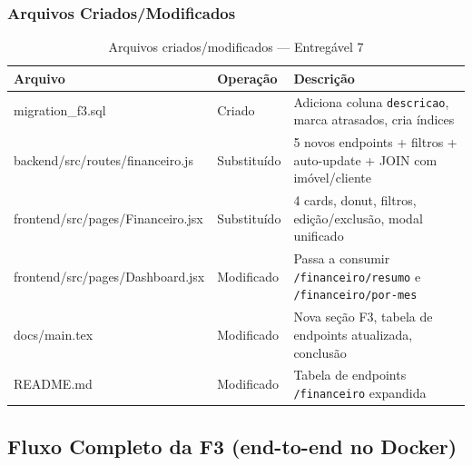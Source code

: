 \documentclass[12pt, a4paper]{article}
\newcommand{\thead}[1]{\cellcolor{tableheader}\color{white}\bfseries #1}
\newcommand{\talt}{\rowcolor{tablerowalt}}
\begin{document}
\subsubsection{Arquivos Criados/Modificados}

\begin{table}[H]
\centering
\begin{tabularx}{\textwidth}{|l|l|X|}
\hline
\thead{Arquivo} & \thead{Operação} & \thead{Descrição} \\
\hline
migration\_f3.sql                       & Criado     & Adiciona coluna \texttt{descricao}, marca atrasados, cria índices \\
\talt backend/src/routes/financeiro.js  & Substituído & 5 novos endpoints + filtros + auto-update + JOIN com imóvel/cliente \\
frontend/src/pages/Financeiro.jsx       & Substituído & 4 cards, donut, filtros, edição/exclusão, modal unificado \\
\talt frontend/src/pages/Dashboard.jsx  & Modificado  & Passa a consumir \texttt{/financeiro/resumo} e \texttt{/financeiro/por-mes} \\
docs/main.tex                           & Modificado  & Nova seção F3, tabela de endpoints atualizada, conclusão \\
\talt README.md                         & Modificado  & Tabela de endpoints \texttt{/financeiro} expandida \\
\hline
\end{tabularx}
\caption{Arquivos criados/modificados — Entregável 7}
\end{table}

\subsection{Fluxo Completo da F3 (end-to-end no Docker)}
\end{document}
